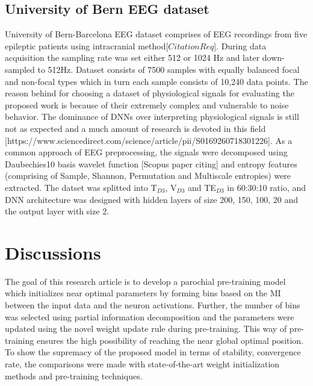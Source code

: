 \documentclass{article}
\begin{document}
\subsection{University of Bern EEG dataset}
University of Bern-Barcelona EEG dataset comprises of EEG recordings from five epileptic patients using intracranial method[$CitationReq$]. During data acquisition the sampling rate was set either 512 or 1024 Hz and later down-sampled to 512Hz. Dataset consists of 7500 samples with equally balanced focal and non-focal types which in turn each sample consists of 10,240 data points. The reason behind for choosing a dataset of physiological signals for evaluating the proposed work is because of their extremely complex and vulnerable to noise behavior.  
The dominance of DNNs over interpreting physiological signals is still not as expected and a much amount of research is devoted in this field [https://www.sciencedirect.com/science/article/pii/S0169260718301226]. As a common approach of EEG preprocessing, the signals were decomposed using Daubechies10 basis wavelet function [Scopus paper citing]  and entropy features (comprising of Sample, Shannon, Permutation and Multiscale entropies) were extracted. The datset was splitted into T$_{D3}$, V$_{D3}$ and TE$_{D3}$ in 60:30:10 ratio, and DNN architecture was designed with hidden layers of size 200, 150, 100, 20 and the output layer with size 2.

\section{Discussions}
The goal of this research article is to develop a parochial pre-training model which
initializes near optimal parameters by forming bins based on the MI between the input
data and the neuron activations. Further, the number of bins was selected using partial
information decomposition and the parameters were updated using the novel weight
update rule during pre-training. This way of pre-training ensures the high possibility of
reaching the near global optimal position. To show the supremacy of the proposed model
in terms of stability, convergence rate, the comparisons were made with state-of-the-art
weight initialization methods and pre-training techniques.
\end{document}
